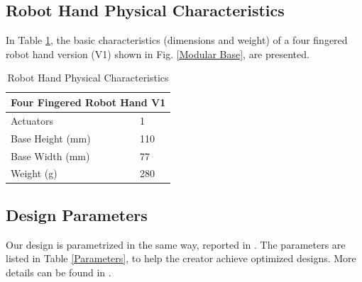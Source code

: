 \subsection{Robot Hand Physical Characteristics}

In Table \ref{Specs}, the basic characteristics (dimensions and weight) of a four fingered robot hand version (V1) shown in Fig. \ref{Modular Base}, are presented.

\begin{table}[h!]
\caption{Robot Hand Physical Characteristics} 
\label{Specs}
\begin{center}
	\begin{tabular}{ | l | l | }
	\hline
 	\multicolumn{2}{|c|}{\bf{Four Fingered Robot Hand V1}} \\
	\hline
	Actuators & 1 \\ \hline
	Base Height (mm) & 110 \\ \hline
	Base Width (mm) & 77 \\ \hline
	Weight (g) & 280\\ \hline
    	\end{tabular}
\end{center}
\end{table}

\subsection{Design Parameters}

Our design is parametrized in the same way, reported in \cite{Ma2013ICRA}. The parameters are listed in Table \ref{Parameters}, to help the creator achieve optimized designs. More details can be found in \cite{DollarAR2005}. 

